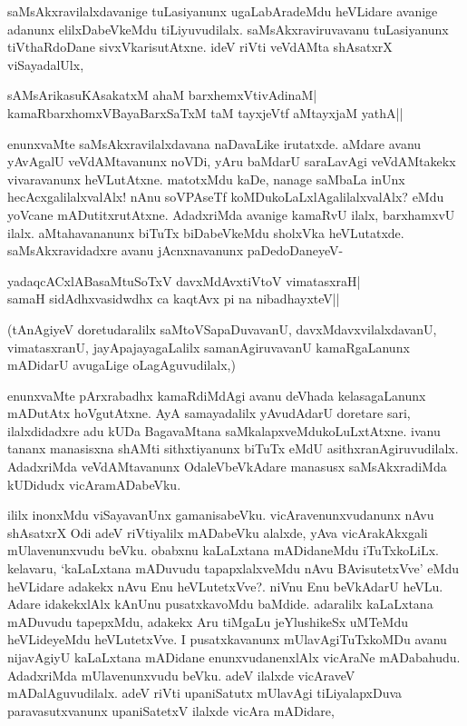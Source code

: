 saMsAkxravilalxdavanige tuLasiyanunx ugaLabAradeMdu heVLidare avanige adanunx elilxDabeVkeMdu tiLiyuvudilalx. saMsAkxraviruvavanu tuLasiyanunx tiVthaRdoDane sivxVkarisutAtxne. ideV riVti veVdAMta shAsatxrX viSayadalUlx,

\begin{shloka}
sAMsArikasuKAsakatxM ahaM barxhemxVtivAdinaM|\\
kamaRbarxhomxVBayaBarxSaTxM taM tayxjeVtf aMtayxjaM yathA||
\end{shloka}

\noindent enunxvaMte saMsAkxravilalxdavana naDavaLike irutatxde. aMdare avanu yAvAgalU veVdAMtavanunx noVDi, yAru baMdarU saraLavAgi veVdAMtakekx vivaravanunx heVLutAtxne. matotxMdu kaDe, nanage saMbaLa inUnx hecAcxgalilalxvalAlx! nAnu soVPAseTf koMDukoLaLxlAgalilalxvalAlx? eMdu yoVcane mADutitxrutAtxne. AdadxriMda avanige kamaRvU ilalx, barxhamxvU ilalx. aMtahavananunx biTuTx biDabeVkeMdu sholxVka heVLutatxde. saMsAkxravidadxre avanu jAcnxnavanunx paDedoDaneyeV-

\begin{shloka}
yadaqcACxlABasaMtuSoTxV davxMdAvxtiVtoV vimatasxraH|\\
samaH sidAdhxvasidwdhx ca kaqtAvx pi na nibadhayxteV||
\end{shloka}

(tAnAgiyeV doretudaralilx saMtoVSapaDuvavanU, davxMdavxvilalxdavanU, vimatasxranU, jayApajayagaLalilx samanAgiruvavanU kamaRgaLanunx mADidarU avugaLige oLagAguvudilalx,)

enunxvaMte pArxrabadhx kamaRdiMdAgi avanu deVhada kelasagaLanunx mADutAtx hoVgutAtxne. AyA samayadalilx yAvudAdarU doretare sari, ilalxdidadxre adu kUDa BagavaMtana saMkalapxveMdukoLuLxtAtxne. ivanu tananx manasisxna shAMti sithxtiyanunx biTuTx eMdU asithxranAgiruvudilalx. AdadxriMda veVdAMtavanunx OdaleVbeVkAdare manasusx saMsAkxradiMda kUDidudx vicAramADabeVku.

ililx inonxMdu viSayavanUnx gamanisabeVku. vicAravenunxvudanunx nAvu shAsatxrX Odi adeV riVtiyalilx mADabeVku alalxde, yAva vicArakAkxgali mUlavenunxvudu beVku. obabxnu kaLaLxtana mADidaneMdu iTuTxkoLiLx. kelavaru, `kaLaLxtana mADuvudu tapapxlalxveMdu nAvu BAvisutetxVve' eMdu heVLidare adakekx nAvu Enu heVLutetxVve?. niVnu Enu beVkAdarU heVLu. Adare idakekxlAlx kAnUnu pusatxkavoMdu baMdide. adaralilx kaLaLxtana mADuvudu tapepxMdu, adakekx Aru tiMgaLu jeYlushikeSx uMTeMdu heVLideyeMdu heVLutetxVve. I pusatxkavanunx mUlavAgiTuTxkoMDu avanu nijavAgiyU kaLaLxtana mADidane enunxvudanenxlAlx vicAraNe mADabahudu. AdadxriMda mUlavenunxvudu beVku. adeV ilalxde vicAraveV mADalAguvudilalx. adeV riVti upaniSatutx mUlavAgi tiLiyalapxDuva paravasutxvanunx upaniSatetxV ilalxde vicAra mADidare,

